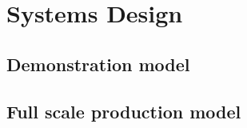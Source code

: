\section{Systems Design}


\subsection{Demonstration model}

\subsection{Full scale production model}

\clearpage